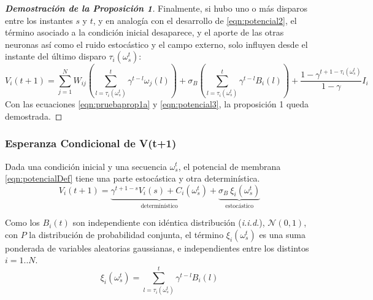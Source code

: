 \begin{proof}[\bf{Demostración de la Proposición 1}]
Finalmente, si hubo uno o más disparos entre los instantes $s$ y $t$, y en analogía con el desarrollo de \eqref{eqn:potencial2}, el término asociado a la condición inicial desaparece, y el aporte de las otras neuronas así como el ruido estocástico y el campo externo, solo influyen desde el instante del último disparo $\tau_i(\omega^t_s)$:
\begin{equation}
     V_i(t+1) = \sum_{j=1}^N W_{ij} \left(\sum_{l=\tau_i(\omega_s^t)}^t \gamma^{t-l}\omega_j(l) \right) + \sigma_B \left(\sum_{l=\tau_i(\omega_s^t)}^t \gamma^{t-l} B_i(l) \right) +\frac{1-\gamma^{t+1-\tau_i(\omega_s^t)}}{1-\gamma} I_i
     \label{eqn:potencial3}
\end{equation}
Con las ecuaciones \eqref{eqn:pruebaprop1a} y \eqref{eqn:potencial3}, la proposición 1 queda demostrada.
\end{proof}

\subsubsection{Esperanza Condicional de V(t+1)}

Dada una condición inicial y una secuencia $\omega_s^t$, el potencial de membrana \eqref{eqn:potencialDef} tiene una parte estocástica y otra determinística.
\begin{equation}
  V_i(t+1) = \underbrace{\gamma^{t+1-s} V_i(s) + C_i(\omega_s^t)}_{\text{determinístico}} + \underbrace{\sigma_B \  \xi_i(\omega_s^t)}_{\text{estocástico}}
  \label{eqn:potencialCompacto}
\end{equation}

Como los $B_i(t)$ son independiente con idéntica distribución (\emph{i.i.d.}), $\mathcal{N}(0,1)$, con $P$ la distribución de probabilidad conjunta, el término $ \xi_i(\omega_s^t)$ es una suma ponderada de variables aleatorias gaussianas, e independientes entre los distintos $i=1..N$.
\begin{equation}
\xi_i(\omega_s^t) = \sum_{l=\tau_i(\omega_s^t)}^t \gamma^{t-l} B_i(l)
\label{eqn:xi1}
\end{equation}

